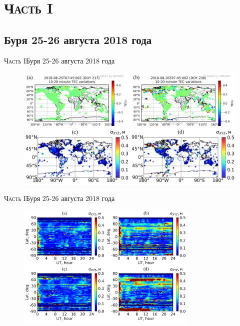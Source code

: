 \section{\textsc{Часть I}}

\subsection{Буря 25-26 августа 2018 года}
\begin{frame}{\textsc{Часть I}}{Буря 25-26 августа 2018 года}
\begin{figure}
\includegraphics[width=\textwidth]{../fig/2018-237-238-07-45.png}    
\end{figure} 
\end{frame}

\begin{frame}{\textsc{Часть I}}{Буря 25-26 августа 2018 года}
\begin{figure}
\includegraphics[width=0.77\textwidth]{../fig/2018-237-238.png}   
\end{figure} 
\end{frame}

